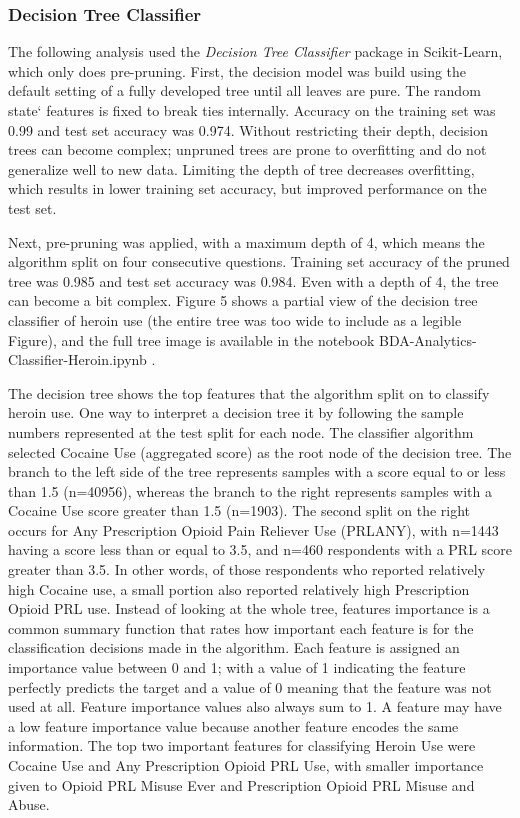 \documentclass[sigconf]{acmart}
\begin{document}
\subsubsection{Decision Tree Classifier}

The following analysis used the \emph{Decision Tree Classifier} package in 
Scikit-Learn, which only does pre-pruning. First, the decision model was build
using the default setting of a fully developed tree until all leaves are pure. 
The random state` features is fixed to break ties internally. Accuracy on the
training set was 0.99 and test set accuracy was 0.974. Without restricting 
their depth, decision trees can become complex; unpruned trees are prone to 
overfitting and do not generalize well to new data. Limiting the depth of 
tree decreases overfitting, which results in lower training set accuracy, 
but improved performance on the test set. 

Next, pre-pruning was applied, with 
a maximum depth of 4, which means the algorithm split on four consecutive
questions. Training set accuracy of the pruned tree was 0.985 and test set
accuracy was 0.984. Even with a depth of 4, the tree can become a bit complex.
Figure 5 shows a partial view of the decision tree classifier of heroin use 
(the entire tree was too wide to include as a legible Figure), and the full 
tree image is available in the notebook BDA-Analytics-Classifier-Heroin.ipynb 
\cite{classifyH}. 

The decision tree shows the top features that the algorithm 
split on to classify heroin use. One way to interpret a decision tree it by 
following the sample numbers represented at the test split for each node. 
The classifier algorithm selected Cocaine Use (aggregated score) as the root 
node of the decision tree. The branch to the left  side of the tree represents 
samples with a score equal to or less than 1.5 (n=40956), whereas the branch 
to the right represents samples with a Cocaine Use score greater than 1.5
(n=1903). The second split on the right occurs for Any Prescription Opioid 
Pain Reliever Use (PRLANY), with n=1443 having a score less than or equal 
to 3.5, and n=460 respondents with a PRL score greater than 3.5. In other 
words, of those respondents who reported relatively high Cocaine use, a small
portion also reported relatively high Prescription Opioid PRL use. Instead of 
looking at the whole tree, features importance is a common summary function 
that rates how important each feature is for the classification decisions 
made in the algorithm. Each feature is assigned an importance value between 
0 and 1; with a value of 1 indicating the feature perfectly predicts the 
target and a value of 0 meaning that the feature was not used at all. 
Feature importance values also always sum to 1. A feature may have a low 
feature importance value because another feature encodes the same information. 
The top two important features for classifying Heroin Use were Cocaine Use 
and Any Prescription Opioid PRL Use, with smaller importance given to Opioid 
PRL Misuse Ever and Prescription Opioid PRL Misuse and Abuse. 
\end{document}
